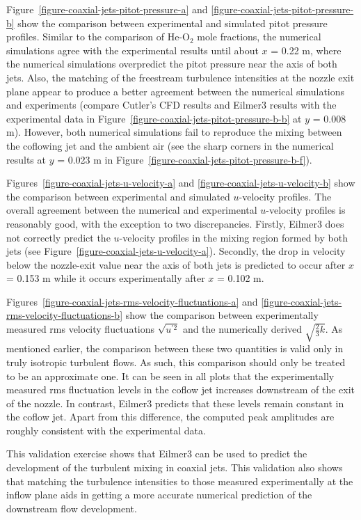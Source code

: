 Figure~\ref{figure-coaxial-jets-pitot-pressure-a} and 
\ref{figure-coaxial-jets-pitot-pressure-b} show the comparison
between experimental and simulated pitot pressure profiles. Similar to
the comparison of He-O$_2$ mole fractions, the numerical simulations
agree with the experimental results until about $x$ = 0.22 m, where the
numerical simulations overpredict the pitot pressure near the axis of
both jets. Also, the matching of the freestream turbulence intensities
at the nozzle exit plane appear to produce a better agreement 
between the numerical simulations and experiments (compare Cutler's CFD
results and Eilmer3 results with the experimental data in Figure~\ref{figure-coaxial-jets-pitot-pressure-b-b}
at $y$ = 0.008 m). However, both numerical simulations fail to reproduce
the mixing between the coflowing jet and the ambient air (see the sharp
corners in the numerical results at $y$ = 0.023 m in Figure~\ref{figure-coaxial-jets-pitot-pressure-b-f}).

Figures~\ref{figure-coaxial-jets-u-velocity-a} and 
\ref{figure-coaxial-jets-u-velocity-b} show the comparison
between experimental and simulated  $u$-velocity profiles.
The overall agreement between the numerical and experimental $u$-velocity profiles
is reasonably good, with the exception to two discrepancies. Firstly, 
Eilmer3 does not correctly predict the $u$-velocity profiles in the mixing 
region formed by both jets (see Figure~\ref{figure-coaxial-jets-u-velocity-a}). 
Secondly, the drop in velocity below the nozzle-exit value near the axis 
of both jets is predicted to occur after $x$ = 0.153 m while it occurs 
experimentally after $x$ = 0.102 m. 

Figures~\ref{figure-coaxial-jets-rms-velocity-fluctuations-a} and
\ref{figure-coaxial-jets-rms-velocity-fluctuations-b} show the comparison
between experimentally measured rms velocity fluctuations $\sqrt{u^{'2}}$ 
and the numerically derived $\sqrt{\frac{2}{3}k}$. As mentioned earlier, the
comparison between these two quantities is valid only in truly isotropic
turbulent flows. As such, this comparison should only be treated to be
an approximate one. It can be seen in all plots that the experimentally measured
rms fluctuation levels in the coflow jet increases downstream of the exit of the 
nozzle. In contrast, Eilmer3 predicts that these levels remain constant in the 
coflow jet. Apart from this difference, the computed peak amplitudes are roughly 
consistent with the experimental data.

This validation exercise shows that Eilmer3 can be used to predict the development 
of the turbulent mixing in coaxial jets. This validation also shows that matching
the turbulence intensities to those measured experimentally at the inflow plane
aids in getting a more accurate numerical prediction of the downstream flow
development.


